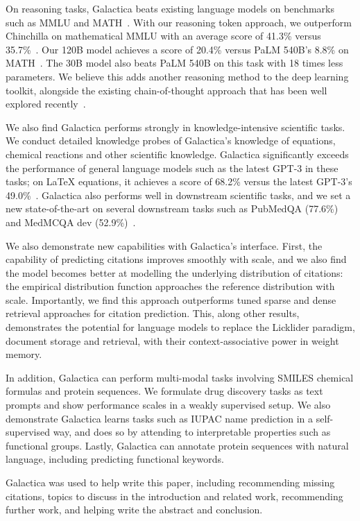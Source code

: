 On reasoning tasks, Galactica beats existing language models on benchmarks such as MMLU and MATH~\citep{MMMLU, MATH}. With our reasoning token approach, we outperform Chinchilla on mathematical MMLU with an average score of 41.3\% versus 35.7\%~\citep{Chinchilla}. Our 120B model achieves a score of 20.4\% versus PaLM 540B's 8.8\% on MATH~\citep{PaLM, Minerva}. The 30B model also beats PaLM 540B on this task with 18 times less parameters. We believe this adds another reasoning method to the deep learning toolkit, alongside the existing chain-of-thought approach that has been well explored recently~\citep{ChainOfThought, CoTBigBENCH}.

We also find Galactica performs strongly in knowledge-intensive scientific tasks. We conduct detailed knowledge probes of Galactica's knowledge of equations, chemical reactions and other scientific knowledge. Galactica significantly exceeds the performance of general language models such as the latest GPT-3 in these tasks; on LaTeX equations, it achieves a score of 68.2\% versus the latest GPT-3's 49.0\%~\citep{GPT3}. Galactica also performs well in downstream scientific tasks, and we set a new state-of-the-art on several downstream tasks such as PubMedQA (77.6\%) and MedMCQA dev (52.9\%)~\citep{PubMedQA, MedMCQA}. 

We also demonstrate new capabilities with Galactica's interface. First, the capability of predicting citations improves smoothly with scale, and we also find the model  becomes better at modelling the underlying distribution of citations: the empirical distribution function approaches the reference distribution with scale. Importantly, we find this approach outperforms tuned sparse and dense retrieval approaches for citation prediction. This, along other results, demonstrates the potential for language models to replace the Licklider paradigm, document storage and retrieval, with their context-associative power in weight memory.

In addition, Galactica can perform multi-modal tasks involving SMILES chemical formulas and protein sequences. We formulate drug discovery tasks as text prompts and show performance scales in a weakly supervised setup. We also demonstrate Galactica learns tasks such as IUPAC name prediction in a self-supervised way, and does so by attending to interpretable properties such as functional groups. Lastly, Galactica can annotate protein sequences with natural language, including predicting functional keywords.

Galactica was used to help write this paper, including recommending missing citations, topics to discuss in the introduction and related work, recommending further work, and helping write the abstract and conclusion.

